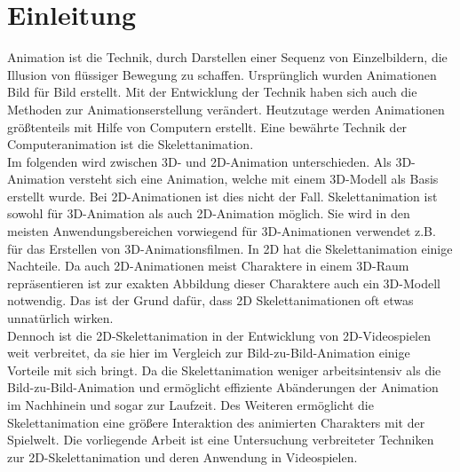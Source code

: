 %
%
%
%
\chapter{Einleitung}
\label{cha:introduction}
%
%
Animation ist die Technik, durch Darstellen einer Sequenz von Einzelbildern, die Illusion von flüssiger Bewegung zu schaffen. Ursprünglich wurden Animationen Bild für Bild erstellt. Mit der Entwicklung der Technik haben sich auch die Methoden zur Animationserstellung verändert. Heutzutage werden Animationen größtenteils mit Hilfe von Computern erstellt. Eine bewährte Technik der Computeranimation ist die Skelettanimation. \\

Im folgenden wird zwischen 3D- und 2D-Animation unterschieden. Als 3D-Animation versteht sich eine Animation, welche mit einem 3D-Modell als Basis erstellt wurde. Bei 2D-Animationen ist dies nicht der Fall. Skelettanimation ist sowohl für 3D-Animation als auch 2D-Animation möglich. Sie wird in den meisten Anwendungsbereichen vorwiegend für 3D-Animationen verwendet z.B. für das Erstellen von 3D-Animationsfilmen. In 2D hat die Skelettanimation einige Nachteile. Da auch 2D-Animationen meist Charaktere in einem 3D-Raum repräsentieren ist zur exakten Abbildung dieser Charaktere auch ein 3D-Modell notwendig. Das ist der Grund dafür, dass 2D Skelettanimationen oft etwas unnatürlich wirken. \\

Dennoch ist die 2D-Skelettanimation in der Entwicklung von 2D-Videospielen weit verbreitet, da sie hier im Vergleich zur Bild-zu-Bild-Animation einige Vorteile mit sich bringt. Da die Skelettanimation weniger arbeitsintensiv als die Bild-zu-Bild-Animation und ermöglicht effiziente Abänderungen der Animation im Nachhinein und sogar zur Laufzeit. Des Weiteren ermöglicht die Skelettanimation eine größere Interaktion des animierten Charakters mit der Spielwelt. Die vorliegende Arbeit ist eine Untersuchung verbreiteter Techniken zur 2D-Skelettanimation und deren Anwendung in Videospielen. \\
